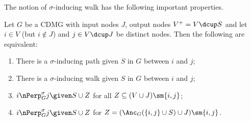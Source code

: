 The notion of $\sigma$-inducing walk has the following important properties.
\begin{Prp}\label{prp:sigma-inducing_path_properties}
  Let $G$ be a CDMG with input nodes $J$, output nodes $V^+ = V \dcup S$ and let $i \in V$ (but $i \notin J$) and $j \in V \dcup J$ be distinct nodes. 
  Then the following are equivalent:
  \begin{enumerate}[label=(\roman*)]
    \item There is a $\sigma$-inducing path given $S$ in $G$ between $i$ and $j$;\label{prp:sigma-inducing_path_properties2:i}
    \item There is a $\sigma$-inducing walk given $S$ in $G$ between $i$ and $j$;\label{prp:sigma-inducing_path_properties2:ii}
    \item $i \nPerp^\sigma_G j \given S \cup Z$ for all $Z \subseteq (V \cup J) \sm \{i,j\}$;\label{prp:sigma-inducing_path_properties2:iii}
    \item $i \nPerp^\sigma_G j \given S \cup Z$ for $Z = (\Anc_G(\{i,j\} \cup S) \cup J) \sm \{i,j\}$.\label{prp:sigma-inducing_path_properties2:iv}
  \end{enumerate}
\end{Prp}

